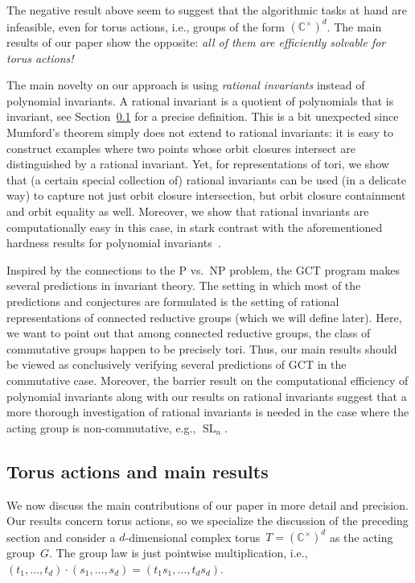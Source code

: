 \documentclass[10pt,a4paper]{article}
\DeclareMathOperator{\SL}{SL}
\theoremstyle{definition}
\numberwithin{equation}{section}
\newcommand{\CC}{\mathbb{C}}
\begin{document}
The negative result above seem to suggest that the algorithmic tasks at hand are infeasible, even for torus actions, i.e., groups of the form $(\CC^\times)^d$.
The main results of our paper show the opposite: \emph{all of them are efficiently solvable for torus actions!}

The main novelty on our approach is using {\em rational invariants} instead of polynomial invariants.
A rational invariant is a quotient of polynomials that is invariant, see Section~\ref{subsec:intro-main-results} for a precise definition.
This is a bit unexpected since Mumford's theorem simply does not extend to rational invariants: it is easy to construct examples where two points whose orbit closures intersect are distinguished by a rational invariant.
Yet, for representations of tori, we show that (a certain special collection of) rational invariants can be used (in a delicate way) to capture not just orbit closure intersection, but orbit closure containment and orbit equality as well.
Moreover, we show that rational invariants are computationally easy in this case, in stark contrast with the aforementioned hardness results for polynomial invariants~\cite{GIMOWW}.

Inspired by the connections to the P vs.~NP problem, the GCT program makes several predictions in invariant theory.
The setting in which most of the predictions and conjectures are formulated is the setting of rational representations of connected reductive groups
(which we will define later). Here, we want to point out that among connected reductive groups, the class of commutative groups happen to be precisely tori.
Thus, our main results should be viewed as conclusively verifying several predictions of GCT in the commutative case.
Moreover, the barrier result on the computational efficiency of polynomial invariants \cite{GIMOWW} along with our results on rational invariants suggest
that a more thorough investigation of rational invariants is needed in the case where the acting group is non-commutative, e.g., $\SL_n$.

%

%
%
%
%

%
\subsection{Torus actions and main results} \label{subsec:intro-main-results}
%
We now discuss the main contributions of our paper in more detail and precision.
Our results concern torus actions, so we specialize the discussion of the preceding section and consider a $d$-dimensional
complex torus~$T = (\CC^\times)^d$ as the acting group~$G$.
The group law is just pointwise multiplication, i.e.,
$(t_1,\dots,t_d) \cdot (s_1,\dots,s_d) = (t_1s_1,\dots,t_ds_d)$.
\end{document}
